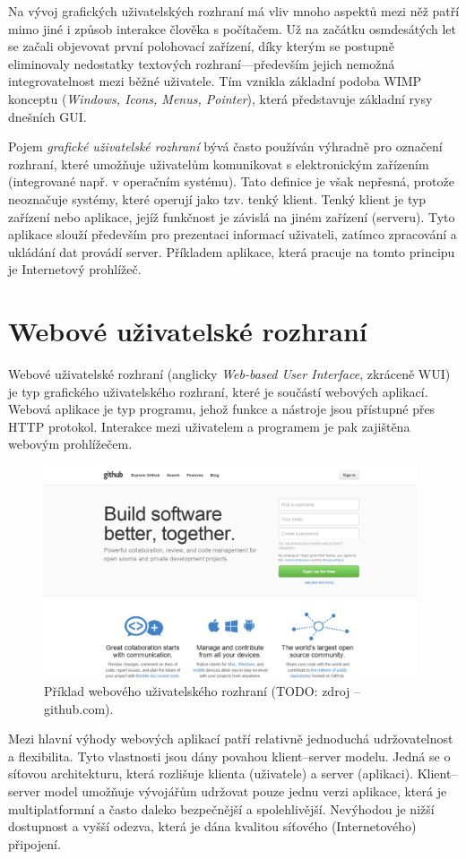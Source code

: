Na vývoj grafických uživatelských rozhraní má vliv mnoho aspektů mezi něž patří mimo jiné i způsob interakce člověka s počítačem. Už na začátku osmdesátých let se začali objevovat první polohovací zařízení, díky kterým se postupně eliminovaly nedostatky textových rozhraní---především jejich nemožná integrovatelnost mezi běžné uživatele. Tím vznikla základní podoba WIMP konceptu (\textit{Windows, Icons, Menus, Pointer}), která představuje základní rysy dnešních GUI.

Pojem \textit{grafické uživatelské rozhraní} bývá často používán výhradně pro označení rozhraní, které umožňuje uživatelům komunikovat s elektronickým zařízením (integrované např. v operačním systému). Tato definice je však nepřesná, protože neoznačuje systémy, které operují jako tzv. tenký klient. Tenký klient je typ zařízení nebo aplikace, jejíž funkčnost je závislá na jiném zařízení (serveru). Tyto aplikace slouží především pro prezentaci informací uživateli, zatímco zpracování a ukládání dat provádí server. Příkladem aplikace, která pracuje na tomto principu je Internetový prohlížeč.

\section{Webové uživatelské rozhraní}
\label{sec:wui}

Webové uživatelské rozhraní (anglicky \textit{Web-based User Interface}, zkráceně WUI) je typ grafického uživatelského rozhraní, které je součástí webových aplikací. Webová aplikace je typ programu, jehož funkce a nástroje jsou přístupné přes HTTP protokol. Interakce mezi uživatelem a programem je pak zajištěna webovým prohlížečem.

\begin{figure}[htbp]
    \centering
    \includegraphics[width=11cm]{images/wui-example.png}
    \caption{Příklad webového uživatelského rozhraní (TODO: zdroj -- github.com).}
\end{figure}

Mezi hlavní výhody webových aplikací patří relativně jednoduchá udržovatelnost a flexibilita. Tyto vlastnosti jsou dány povahou klient--server modelu. Jedná se o síťovou architekturu, která rozlišuje klienta (uživatele) a server (aplikaci). Klient--server model umožňuje vývojářům udržovat pouze jednu verzi aplikace, která je multiplatformní a často daleko bezpečnější a spolehlivější. Nevýhodou je nižší dostupnost a vyšší odezva, která je dána kvalitou síťového (Internetového) připojení.
